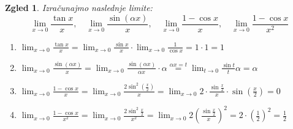 \documentclass[10pt, a4paper]{article}
\newtheorem{zgled}[izr]{Zgled}
\newcommand{\limf}[3]{\lim_{#1 \to #2} {#3}}
\begin{document}
\begin{zgled}
    Izračunajmo naslednje limite:
    $$\limf{x}{0}{\frac{\tan x}{x}}, \quad \limf{x}{0}{\frac{\sin (\alpha x)}{x}}, \quad \limf{x}{0}{\frac{1 - \cos x}{x}}, \quad \limf{x}{0}{\frac{1 - \cos x}{x^2}}$$

    \begin{enumerate}
        \item $\displaystyle \limf{x}{0}{\frac{\tan x}{x}}  = \limf{x}{0}{\frac{\sin x}{x}} \cdot \limf{x}{0}{\frac{1}{\cos x}} = 1 \cdot 1 = 1$
        \item $\displaystyle \limf{x}{0}{\frac{\sin (\alpha x)}{x}} = \limf{x}{0}{\frac{\sin (\alpha x)}{\alpha x} \cdot \alpha} 
        \stackrel{\alpha x = t}{=} \limf{t}{0}{\frac{\sin t}{t} \alpha}
        = \alpha$
        \item $\displaystyle \limf{x}{0}{\frac{1 - \cos x}{x}} = \limf{x}{0}{\frac{2 \sin^2 \left( \frac{x}{2} \right)}{x}}
        = \limf{x}{0}{2 \cdot \frac{\sin \frac{x}{2}}{x} \cdot \sin \left(\frac{x}{2}\right)}
        = 0$
        \item $\displaystyle \limf{x}{0}{\frac{1 - \cos x}{x^2}} = \limf{x}{0}{\frac{2 \sin^2 \frac{x}{2}}{x^2}}
        = \limf{x}{0}{2\left( \frac{\sin \frac{x}{2}}{x} \right)^2}
        = 2 \cdot \left(\frac{1}{2}\right)^2 = \frac{1}{2}$
    \end{enumerate}
\end{zgled}

\end{document}
